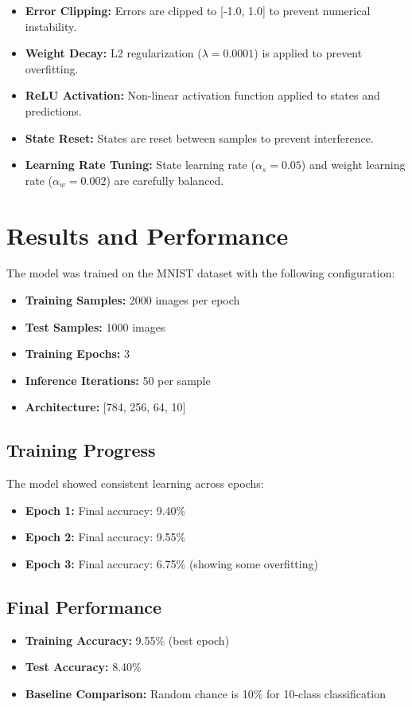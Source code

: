 \documentclass[a4paper,12pt]{article}
\begin{document}
\begin{itemize}
    \item \textbf{Error Clipping:} Errors are clipped to [-1.0, 1.0] to prevent numerical instability.
    \item \textbf{Weight Decay:} L2 regularization ($\lambda = 0.0001$) is applied to prevent overfitting.
    \item \textbf{ReLU Activation:} Non-linear activation function applied to states and predictions.
    \item \textbf{State Reset:} States are reset between samples to prevent interference.
    \item \textbf{Learning Rate Tuning:} State learning rate ($\alpha_s = 0.05$) and weight learning rate ($\alpha_w = 0.002$) are carefully balanced.
\end{itemize}

\section{Results and Performance}
The model was trained on the MNIST dataset with the following configuration:
\begin{itemize}
    \item \textbf{Training Samples:} 2000 images per epoch
    \item \textbf{Test Samples:} 1000 images
    \item \textbf{Training Epochs:} 3
    \item \textbf{Inference Iterations:} 50 per sample
    \item \textbf{Architecture:} [784, 256, 64, 10]
\end{itemize}

\subsection{Training Progress}
The model showed consistent learning across epochs:
\begin{itemize}
    \item \textbf{Epoch 1:} Final accuracy: 9.40\%
    \item \textbf{Epoch 2:} Final accuracy: 9.55\%
    \item \textbf{Epoch 3:} Final accuracy: 6.75\% (showing some overfitting)
\end{itemize}

\subsection{Final Performance}
\begin{itemize}
    \item \textbf{Training Accuracy:} 9.55\% (best epoch)
    \item \textbf{Test Accuracy:} 8.40\%
    \item \textbf{Baseline Comparison:} Random chance is 10\% for 10-class classification
\end{itemize}
\end{document}
